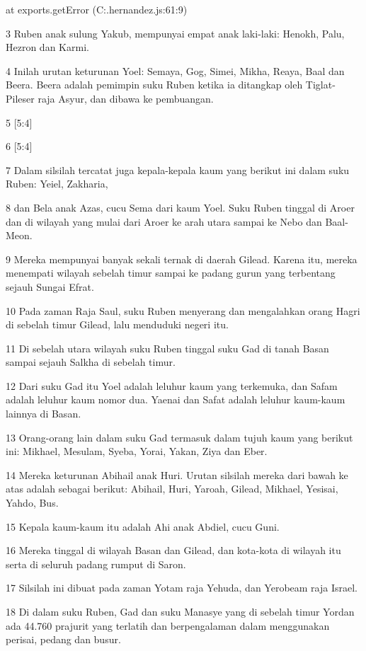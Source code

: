 at exports.getError (C:\Users\josea.hernandez\Documents\GitHub\urantiapedia\app\utils.js:61:9)
\par 3 Ruben anak sulung Yakub, mempunyai empat anak laki-laki: Henokh, Palu, Hezron dan Karmi.
\par 4 Inilah urutan keturunan Yoel: Semaya, Gog, Simei, Mikha, Reaya, Baal dan Beera. Beera adalah pemimpin suku Ruben ketika ia ditangkap oleh Tiglat-Pileser raja Asyur, dan dibawa ke pembuangan.
\par 5 [5:4]
\par 6 [5:4]
\par 7 Dalam silsilah tercatat juga kepala-kepala kaum yang berikut ini dalam suku Ruben: Yeiel, Zakharia,
\par 8 dan Bela anak Azas, cucu Sema dari kaum Yoel. Suku Ruben tinggal di Aroer dan di wilayah yang mulai dari Aroer ke arah utara sampai ke Nebo dan Baal-Meon.
\par 9 Mereka mempunyai banyak sekali ternak di daerah Gilead. Karena itu, mereka menempati wilayah sebelah timur sampai ke padang gurun yang terbentang sejauh Sungai Efrat.
\par 10 Pada zaman Raja Saul, suku Ruben menyerang dan mengalahkan orang Hagri di sebelah timur Gilead, lalu menduduki negeri itu.
\par 11 Di sebelah utara wilayah suku Ruben tinggal suku Gad di tanah Basan sampai sejauh Salkha di sebelah timur.
\par 12 Dari suku Gad itu Yoel adalah leluhur kaum yang terkemuka, dan Safam adalah leluhur kaum nomor dua. Yaenai dan Safat adalah leluhur kaum-kaum lainnya di Basan.
\par 13 Orang-orang lain dalam suku Gad termasuk dalam tujuh kaum yang berikut ini: Mikhael, Mesulam, Syeba, Yorai, Yakan, Ziya dan Eber.
\par 14 Mereka keturunan Abihail anak Huri. Urutan silsilah mereka dari bawah ke atas adalah sebagai berikut: Abihail, Huri, Yaroah, Gilead, Mikhael, Yesisai, Yahdo, Bus.
\par 15 Kepala kaum-kaum itu adalah Ahi anak Abdiel, cucu Guni.
\par 16 Mereka tinggal di wilayah Basan dan Gilead, dan kota-kota di wilayah itu serta di seluruh padang rumput di Saron.
\par 17 Silsilah ini dibuat pada zaman Yotam raja Yehuda, dan Yerobeam raja Israel.
\par 18 Di dalam suku Ruben, Gad dan suku Manasye yang di sebelah timur Yordan ada 44.760 prajurit yang terlatih dan berpengalaman dalam menggunakan perisai, pedang dan busur.
